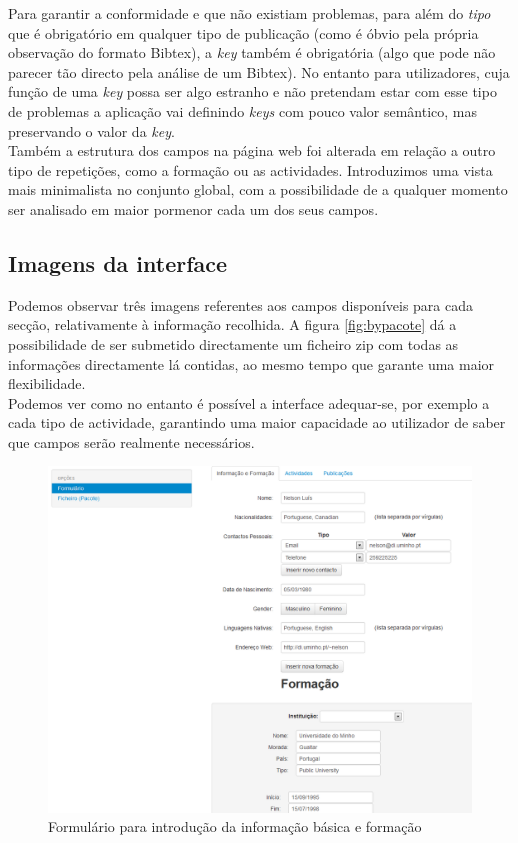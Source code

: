 \documentclass[a4paper,11pt,openright,openbib]{article}
\begin{document}
Para garantir a conformidade e que não existiam problemas, para além do \emph{tipo} que é obrigatório em qualquer tipo de publicação (como é óbvio pela própria observação do formato Bibtex), a \emph{key} também é obrigatória (algo que pode não parecer tão directo pela análise de um Bibtex). No entanto para utilizadores, cuja função de uma \emph{key} possa ser algo estranho e não pretendam estar com esse tipo de problemas a aplicação vai definindo \emph{keys} com pouco valor semântico, mas preservando o valor da \emph{key}.\\
Também a estrutura dos campos na página web foi alterada em relação a outro tipo de repetições, como a formação ou as actividades. Introduzimos uma vista mais minimalista no conjunto global, com a possibilidade de a qualquer momento ser analisado em maior pormenor cada um dos seus campos.
\subsection{Imagens da interface}
Podemos observar três imagens referentes aos campos disponíveis para cada secção, relativamente à informação recolhida. A figura \ref{fig:bypacote} dá a possibilidade de ser submetido directamente um ficheiro zip com todas as informações directamente lá contidas, ao mesmo tempo que garante uma maior flexibilidade.\\
Podemos ver como no entanto é possível a interface adequar-se, por exemplo a cada tipo de actividade, garantindo uma maior capacidade ao utilizador de saber que campos serão realmente necessários.
\begin{figure}[!ht]
\centering
\includegraphics[scale=0.6]{iInfo.png}
\caption{Formulário para introdução da informação básica e formação}
\label{fig:iinfo}
\end{figure}
\end{document}
